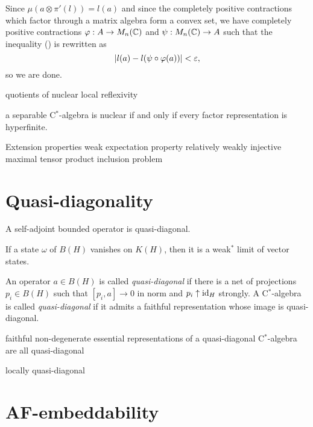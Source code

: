 \documentclass{../../large}
\begin{document}
\begin{pf}
Since $\mu(a\otimes\pi'(l))=l(a)$ and since the completely positive contractions which factor through a matrix algebra form a convex set, we have completely positive contractions $\varphi:A\to M_n(\mathbb{C})$ and $\psi:M_n(\mathbb{C})\to A$ such that the inequality (\dagger) is rewritten as
\[|l(a)-l(\psi\circ\varphi(a))|<\varepsilon,\]
so we are done.
\end{pf}





quotients of nuclear
local reflexivity


a separable C$^*$-algebra is nuclear if and only if every factor representation is hyperfinite.

Extension properties
weak expectation property
relatively weakly injective
maximal tensor product inclusion problem




\section{Quasi-diagonality}

\begin{prb}
A self-adjoint bounded operator is quasi-diagonal.
\end{prb}

\begin{prb}
If a state $\omega$ of $B(H)$ vanishes on $K(H)$, then it is a weak$^*$ limit of vector states.
\end{prb}

\begin{prb}
\end{prb}


\begin{prb}
An operator $a\in B(H)$ is called \emph{quasi-diagonal} if there is a net of projections $p_i\in B(H)$ such that $[p_i,a]\to0$ in norm and $p_i\uparrow\operatorname{id}_H$ strongly.
A C$^*$-algebra is called \emph{quasi-diagonal} if it admits a faithful representation whose image is quasi-diagonal.
\end{prb}

faithful non-degenerate essential representations of a quasi-diagonal C$^*$-algebra are all quasi-diagonal

locally quasi-diagonal

\section{AF-embeddability}
\end{document}
